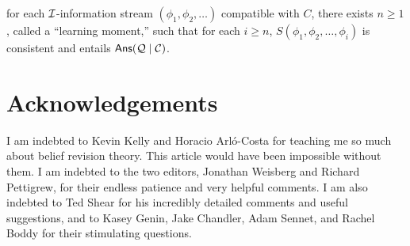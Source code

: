 		\im[(2)] for each $\cal I$-information stream $(\phi_1, \phi_2, \ldots)$ compatible with $C$, there exists $n \ge 1$, called a ``learning moment,'' such that for each $i\ge n$, $S(\phi_1, \phi_2, \ldots, \phi_i)$ is consistent and entails $\mathsf{Ans}({\cal Q} \mid {\cal C})$.
	\ed
\ed   



\section*{Acknowledgements}

I am indebted to Kevin Kelly and Horacio Arl\'{o}-Costa for teaching me so much about belief revision theory. This article would have been impossible without them. I am indebted to the two editors, Jonathan Weisberg and Richard Pettigrew, for their endless patience and very helpful comments. I am also indebted to Ted Shear for his incredibly detailed comments and useful suggestions, and to Kasey Genin, Jake Chandler, Adam Sennet, and Rachel Boddy for their stimulating questions.